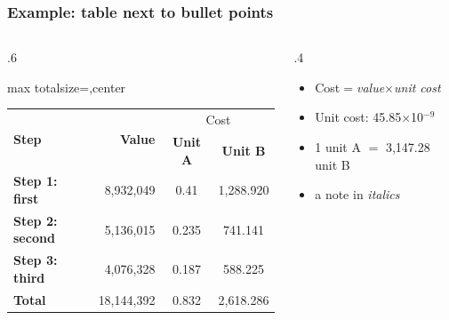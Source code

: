 \begin{frame}
    \frametitle{Example: table next to bullet points}

    \begin{columns}
        \begin{column}{.6\textwidth}
            \begin{adjustbox}{max totalsize={\textwidth}{\textheight},center}
                \begin{tabular}{l r cc}
                    \toprule
                    \multirow{2}{*}{\textbf{\alert{Step}}} & \multirow{2}{*}{\textbf{\alert{Value}}} & \multicolumn{2}{c}{\alert{Cost}} \\
                    & & \textbf{\alert{Unit A}} & \textbf{\alert{Unit B}}\\
                    \midrule
                    \textbf{Step 1: first} & 8,932,049 & 0.41 & 1,288.920\\
                    \textbf{Step 2: second} & 5,136,015 & 0.235 & 741.141\\
                    \textbf{Step 3: third} & 4,076,328 & 0.187 & 588.225\\
                    \textbf{Total} & 18,144,392 & 0.832 & 2,618.286\\
                    \bottomrule
                \end{tabular}
            \end{adjustbox}
        \end{column}
        \begin{column}{.4\textwidth}
            \begin{itemize}\setlength{\itemsep}{1em}
                \item Cost$=$\emph{value}$\times$\emph{unit cost}
                \item Unit cost: 45.85$\times$10$^{-9}$
                \item 1 unit A $=$ 3,147.28 unit B
                \item a note in \emph{italics}
            \end{itemize}
        \end{column}
    \end{columns}

\end{frame}
